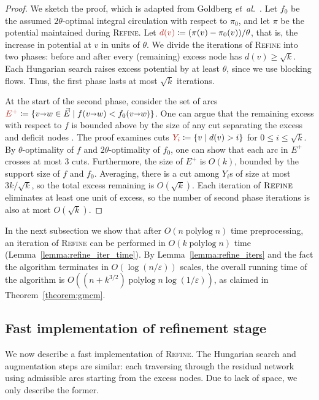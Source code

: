 \documentclass[a4paper,UKenglish,nolineno]{socg-lipics-v2019}
\def\etal{\emph{et~al.}}
\def\etal{\textit{et~al.}}
\def\polylog{\mathop{\mathrm{polylog}}}
\def\eps{\varepsilon}
\def\arcto{\mathord\shortrightarrow}
\def\arc#1#2{#1\arcto#2}
\def\EMPH#1{\textcolor{BrickRed}{{\emph{#1}}}}
\begin{document}
\begin{proof}
We sketch the proof, which is adapted from Goldberg \etal~\cite{GHKT17}.
Let $f_0$ be the assumed $2\theta$-optimal integral circulation with respect to $\pi_0$,
and let $\pi$ be the potential maintained during \textsc{Refine}.
Let $\EMPH{$d(v)$} \coloneqq (\pi(v) - \pi_0(v))/\theta$, that is, the increase in potential
at $v$ in units of $\theta$.
We divide the iterations of \textsc{Refine} into two phases: before and after
every (remaining) excess node has $d(v) \geq \sqrt{k}$.
Each Hungarian search raises excess potential by at least $\theta$,
since we use blocking flows.
Thus, the first phase lasts at most $\sqrt{k}$ iterations.

At the start of the second phase, consider the set of arcs
$\EMPH{$E^+$} \coloneqq \{\arc vw \in \vec{E} \mid f(\arc vw) < f_0(\arc vw)\}$.
One can argue that the remaining excess with respect to $f$ is bounded above by
the size of any cut separating the excess and deficit nodes \cite[Lemma~4]{GHKT17}.
The proof examines cuts $\EMPH{$Y_i$} \coloneqq \{v \mid d(v) > i\}$ for $0 \leq i \leq \sqrt{k}$.
By $\theta$-optimality of $f$ and $2\theta$-optimality of $f_0$, one can show
that each arc in $E^+$ crosses at most 3 cuts.
Furthermore, the size of $E^+$ is $O(k)$, bounded by the support size of $f$ and $f_0$.
Averaging, there is a cut among $Y_i$s of size at most $3k/\sqrt{k}$,
so the total excess remaining is $O(\sqrt{k})$.
Each iteration of $\textsc{Refine}$ eliminates at least one unit of excess,
so the number of second phase iterations is also at most $O(\sqrt{k})$.
\end{proof}

In the next subsection we show that after $O(n\polylog n)$ time preprocessing,
an iteration of \textsc{Refine} can be performed in $O(k\polylog n)$ time
(Lemma~\ref{lemma:refine_iter_time}).
By Lemma~\ref{lemma:refine_iters} and the fact the algorithm terminates in
$O(\log(n/\eps))$ scales, the overall running time of the algorithm is
$O((n + k^{3/2})\polylog n \log(1/\eps))$, as claimed in Theorem~\ref{theorem:gmcm}.

\subsection{Fast implementation of refinement stage}
\label{SS:fast_refine}

We now describe a fast implementation of \textsc{Refine}.
The Hungarian search and augmentation steps are similar:
each traversing through the residual network using admissible arcs starting
from the excess nodes.
Due to lack of space, we only describe the former.
\end{document}
